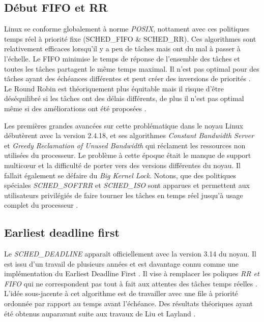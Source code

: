 \documentclass[letterpaper]{article}
\begin{document}
\subsection{Début FIFO et RR}

Linux se conforme globalement à norme \textit{POSIX}, nottament avec ces politiques temps réel à priorité fixe (SCHED\_FIFO \& SCHED\_RR). Ces algorithmes sont relativement efficaces lorsqu'il y a peu de tâches mais ont du mal à passer à l'échelle. Le FIFO minimise le temps de réponse de l'ensemble des tâches et toutes les tâches partagent le même temps maximal. Il n'est pas optimal pour des tâches ayant des échéances différentes et peut créer des inversions de priorités \citep{Klein:1993:PHR:174003}. Le Round Robin est théoriquement plus équitable mais il risque d'être déséquilibré si les tâches ont des délais différents, de plus il n'est pas optimal même si des améliorations ont été proposées \citep{Shreedhar:1995:EFQ:217391.217453}.

Les premières grandes avancées sur cette problématique dans le noyau Linux débutèrent avec la version 2.4.18, et ses algorithmes \textit{Constant Bandwidth Server} \citep{Abeni:1998:IMA:827270.829047} et \textit{Greedy Reclamation of Unused Bandwidth} \citep{Lipari:2000:GRU:1947412.1947445} qui réclament les ressources non utilisées du processeur. Le problème à cette époque était le manque de support multicœur et la difficulté de porter vers des versions différentes du noyau. Il fallait également se défaire du \textit{Big Kernel Lock}. Notons, que des politiques spéciales \textit{SCHED\_SOFTRR} et \textit{SCHED\_ISO} sont apparues et permettent aux utilisateurs privilégiés de faire tourner les tâches en temps réel jusqu'à usage complet du processeur \citep{scordino2006linux}.

\subsection{Earliest deadline first}

Le \textit{SCHED\_DEADLINE} apparaît officiellement avec la version 3.14 du noyau. Il est issu d'un travail de plusieurs années et est davantage connu comme une implémentation du Earliest Deadline First \citep{faggioli2009edf}. Il vise à remplacer les poliques \textit{RR et FIFO} qui ne correspondent pas tout à fait aux attentes des tâches temps réelles \citep{buttazzo2011hard}. L'idée sous-jacente à cet algorithme est de travailler avec une file à priorité ordonnée par rapport au temps avant l'échéance. Des résultats théoriques ayant été obtenus auparavant suite aux travaux de Liu et Layland \citep{liu1973scheduling}.
\end{document}
